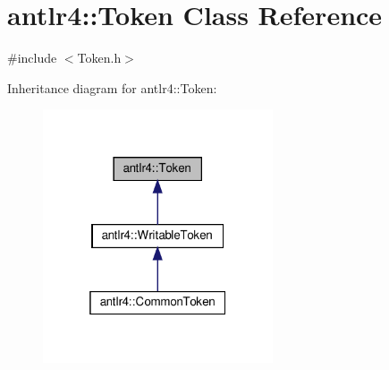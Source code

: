 \hypertarget{classantlr4_1_1Token}{}\section{antlr4\+:\+:Token Class Reference}
\label{classantlr4_1_1Token}


{\ttfamily \#include $<$Token.\+h$>$}



Inheritance diagram for antlr4\+:\+:Token\+:
\nopagebreak
\begin{figure}[H]
\begin{center}
\leavevmode
\includegraphics[width=193pt]{classantlr4_1_1Token__inherit__graph}
\end{center}
\end{figure}
